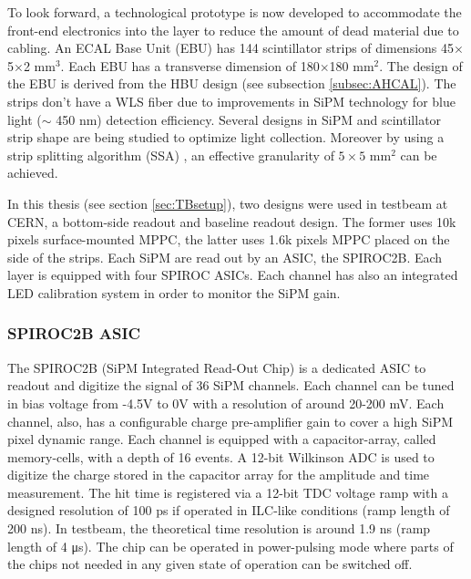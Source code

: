 To look forward, a technological prototype is now developed to accommodate the front-end electronics into the layer to reduce the amount of dead material due to cabling. An ECAL Base Unit (EBU) has 144 scintillator strips of dimensions 45$\times$5$\times$2 mm$^3$. Each EBU has a transverse dimension of 180$\times$180 mm$^2$. The design of the EBU is derived from the HBU design (see subsection \ref{subsec:AHCAL}). The strips don't have a WLS fiber due to improvements in SiPM technology for blue light ($\sim$ 450 nm) detection efficiency. Several designs in SiPM and scintillator strip shape are being studied to optimize light collection. Moreover by using a strip splitting algorithm (SSA) \cite{Kotera:2014psa}, an effective granularity of $5\times5$ mm$^2$ can be achieved.

In this thesis (see section \ref{sec:TBsetup}), two designs were used in testbeam at CERN, a bottom-side readout and baseline readout design. The former uses 10k pixels surface-mounted MPPC, the latter uses 1.6k pixels MPPC placed on the side of the strips. Each SiPM are read out by an ASIC, the SPIROC2B. Each layer is equipped with four SPIROC ASICs. Each channel has also an integrated LED calibration system in order to monitor the SiPM gain.

\subsubsection{SPIROC2B ASIC}
\label{subsec:SPIROC2B}

The SPIROC2B (SiPM Integrated Read-Out Chip) \cite{5401891} is a dedicated ASIC to readout and digitize the signal of 36 SiPM channels. Each channel can be tuned in bias voltage from -4.5V to 0V with a resolution of around 20-200 mV. Each channel, also, has a configurable charge pre-amplifier gain to cover a high SiPM pixel dynamic range. Each channel is equipped with a capacitor-array, called memory-cells, with a depth of 16 events. A 12-bit Wilkinson ADC is used to digitize the charge stored in the capacitor array for the amplitude and time measurement. The hit time is registered via a 12-bit TDC voltage ramp with a designed resolution of 100 ps if operated in ILC-like conditions (ramp length of 200 \si{\nano\second}). In testbeam, the theoretical time resolution is around 1.9 ns (ramp length of 4 \si{\micro\second}). The chip can be operated in power-pulsing mode where parts of the chips not needed in any given state of operation can be switched off.

